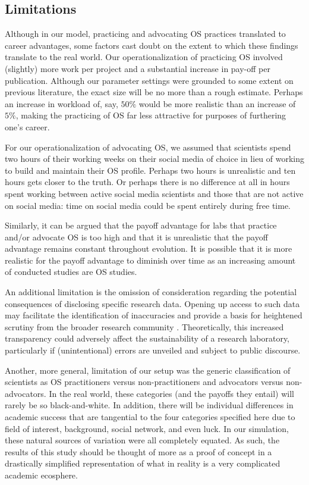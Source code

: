 \documentclass[meta, authordate,issue]{jote-new-article}
\begin{document}
\subsection{Limitations}

Although in our model, practicing and advocating OS practices translated to career advantages, some factors cast doubt on the extent to which these findings translate to the real world. Our operationalization of practicing OS involved (slightly) more work per project and a substantial increase in pay-off per publication. Although our parameter settings were grounded to some extent on previous literature, the exact size will be no more than a rough estimate. Perhaps an increase in workload of, say, $50\%$ would be more realistic than an increase of $5\%$, making the practicing of OS far less attractive for purposes of furthering one's career.

For our operationalization of advocating OS, we assumed that scientists spend two hours of their working weeks on their social media of choice in lieu of working to build and maintain their OS profile. Perhaps two hours is unrealistic and ten hours gets closer to the truth. Or perhaps there is no difference at all in hours spent working between active social media scientists and those that are not active on social media: time on social media could be spent entirely during free time.

Similarly, it can be argued that the payoff advantage for labs that practice and/or advocate OS is too high and that it is unrealistic that the payoff advantage remains constant throughout evolution. It is possible that it is more realistic for the payoff advantage to diminish over time as an increasing amount of conducted studies are OS studies.

An additional limitation is the omission of consideration regarding the potential consequences of disclosing specific research data. Opening up access to such data may facilitate the identification of inaccuracies and provide a basis for heightened scrutiny from the broader research community \parencite{AllenMehler2019}. Theoretically, this increased transparency could adversely affect the sustainability of a research laboratory, particularly if  (unintentional) errors are unveiled and subject to public discourse.

Another, more general, limitation of our setup was the generic classification of scientists as OS practitioners versus non-practitioners and advocators versus non-advocators. In the real world, these categories (and the payoffs they entail) will rarely be so black-and-white. In addition, there will be individual differences in academic success that are tangential to the four categories specified here due to field of interest, background, social network, and even luck. In our simulation, these natural sources of variation were all completely equated. As such, the results of this study should be thought of more as a proof of concept in a drastically simplified representation of what in reality is a very complicated academic ecosphere.
\end{document}
